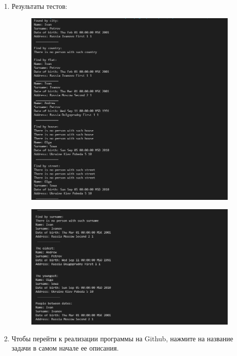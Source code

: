 \documentclass[a4paper]{article}
\begin{document}
\begin{enumerate}
\begin{lstlisting}
                };
            
            
            
            }
        \end{lstlisting}
        \item Результаты тестов:
        
        \begin{figure}[h!]
            \begin{center}
                \includegraphics[scale = 0.6]{test_t3_p1.png}
                \label{p2} %
            \end{center}
        \end{figure}

        \begin{figure}[H]
            \begin{center}
                \includegraphics[scale = 0.6]{test_t3_p2.png}
                \label{p2} %
            \end{center}
        \end{figure}
        \item Чтобы перейти к реализации программы на Github, нажмите на название задачи в самом начале ее описания.
    
    \end{enumerate}
\end{document}

